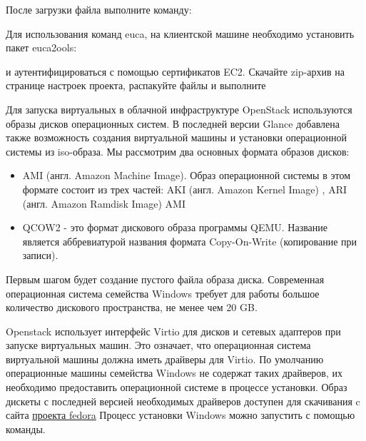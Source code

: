 \documentclass[letterpaper,10pt,russian]{sphinxmanual}
\begin{document}
После загрузки файла выполните команду:


Для использования команд euca, на клиентской машине необходимо установить пакет euca2ools:


и аутентифицироваться с помощью сертификатов EC2. Скачайте zip-архив на странице настроек проекта, распакуйте файлы и выполните


Для запуска виртуальных в облачной инфраструктуре OpenStack используются образы дисков операционных систем. В последней версии Glance добавлена также возможность создания виртуальной машины и установки операционной системы из iso-образа. Мы рассмотрим два основных формата образов дисков:
\begin{itemize}
\item {} 
AMI (англ. Amazon Machine Image). Образ операционной системы в этом формате состоит из трех частей: AKI (англ. Amazon Kernel Image) , ARI (англ. Amazon Ramdisk Image) AMI

\item {} 
QCOW2 - это формат дискового образа программы QEMU. Название является аббревиатурой названия формата Copy-On-Write (копирование при записи).

\end{itemize}

Первым шагом будет создание пустого файла образа диска. Современная операционная система семейства Windows требует для работы большое количество дискового пространства, не менее чем 20 GB.


Openstack использует интерфейс Virtio для дисков и сетевых адаптеров при запуске виртуальных машин. Это означает, что операционная система виртуальной машины должна иметь драйверы для Virtio. По умолчанию операционные машины семейства Windows не содержат таких драйверов, их необходимо предоставить операционной системе в процессе установки. Образ дискеты с последней версией необходимых драйверов доступен для скачивания c сайта \href{http://alt.fedoraproject.org/pub/alt/virtio-win/latest/images/bin/}{проекта fedora}
Процесс установки Windows можно запустить с помощью команды.

\end{document}
